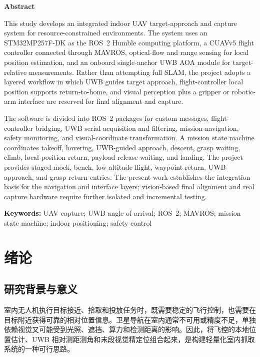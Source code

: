 \documentclass[12pt,a4paper]{ctexart}
\begin{document}
\begin{center}{\bfseries Abstract}\end{center}
{
\noindent

This study develops an integrated indoor UAV target-approach and capture system for resource-constrained environments. The system uses an STM32MP257F-DK as the ROS~2 Humble computing platform, a CUAVv5 flight controller connected through MAVROS, optical-flow and range sensing for local position estimation, and an onboard single-anchor UWB AOA module for target-relative measurements. Rather than attempting full SLAM, the project adopts a layered workflow in which UWB guides target approach, flight-controller local position supports return-to-home, and visual perception plus a gripper or robotic-arm interface are reserved for final alignment and capture.

\noindent

The software is divided into ROS~2 packages for custom messages, flight-controller bridging, UWB serial acquisition and filtering, mission navigation, safety monitoring, and visual-coordinate transformation. A mission state machine coordinates takeoff, hovering, UWB-guided approach, descent, grasp waiting, climb, local-position return, payload release waiting, and landing. The project provides staged mock, bench, low-altitude flight, waypoint-return, UWB-approach, and grasp-return entries. The present work establishes the integration basis for the navigation and interface layers; vision-based final alignment and real capture hardware require further isolated and incremental testing.

\noindent\textbf{Keywords:} UAV capture; UWB angle of arrival; ROS~2; MAVROS; mission state machine; indoor positioning; safety control
}

\clearpage
\tableofcontents
\clearpage

\section{绪论}
\subsection{研究背景与意义}
室内无人机执行目标接近、拾取和投放任务时，既需要稳定的飞行控制，也需要在目标附近获得可靠的相对位置信息。卫星导航在室内通常不可用或精度不足，单独依赖视觉又可能受到光照、遮挡、算力和检测距离的影响。因此，将飞控的本地位置估计、UWB 相对测距测角和末段视觉精定位组合起来，是构建轻量化室内抓取系统的一种可行思路。
\end{document}
